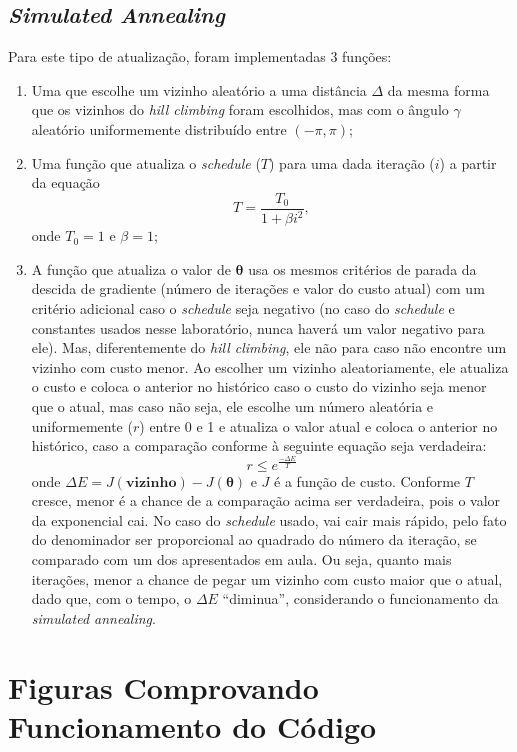 \documentclass[brazil, 12pt]{article}
\begin{document}
\subsection{\emph{Simulated Annealing}}
Para este tipo de atualização, foram implementadas 3 funções:
\begin{enumerate}
	\item Uma que escolhe um vizinho aleatório a uma distância $\Delta$ da mesma forma que os vizinhos do \textit{hill climbing} foram escolhidos, mas com o ângulo $\gamma$ aleatório uniformemente distribuído entre $(-\pi, \pi)$; 
	\item Uma função que atualiza o \textit{schedule} ($T$) para uma dada iteração ($i$) a partir da equação$$T=\frac{T_{0}}{1+\beta i^{2}},$$onde $T_{0}=1$ e $\beta=1$; 
	\item A função que atualiza o valor de $\boldsymbol{\theta}$ usa os mesmos critérios de parada da descida de gradiente (número de iterações e valor do custo atual) com um critério adicional caso o \textit{schedule} seja negativo (no caso do \textit{schedule} e constantes usados nesse laboratório, nunca haverá um valor negativo para ele). Mas, diferentemente do \textit{hill climbing}, ele não para caso não encontre um vizinho com custo menor. Ao escolher um vizinho aleatoriamente, ele atualiza o custo e coloca o anterior no histórico caso o custo do vizinho seja menor que o atual, mas caso não seja, ele escolhe um número aleatória e uniformemente ($r$) entre 0 e 1 e atualiza o valor atual e coloca o anterior no histórico, caso a comparação conforme à seguinte equação seja verdadeira:
	$$r\leq e^{\frac{-\Delta E}{T}}$$onde $\Delta E=J(\boldsymbol{vizinho})-J(\boldsymbol{\theta})$ e $J$ é a função de custo. Conforme $T$ cresce, menor é a chance de a comparação acima ser verdadeira, pois o valor da exponencial cai. No caso do \textit{schedule} usado, vai cair mais rápido, pelo fato do denominador ser proporcional ao quadrado do número da iteração, se comparado com um dos apresentados em aula. Ou seja, quanto mais iterações, menor a chance de pegar um vizinho com custo maior que o atual, dado que, com o tempo, o $\Delta E$ ``diminua'', considerando o funcionamento da \textit{simulated annealing}.
\end{enumerate}


\section{Figuras Comprovando Funcionamento do Código}
\end{document}
